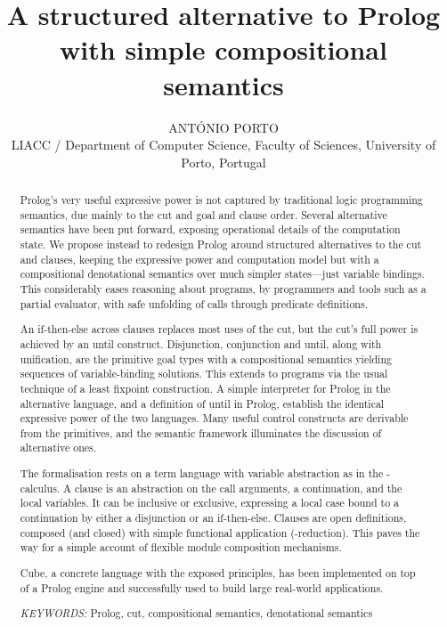 \documentclass{tlp}
\title{A structured alternative to Prolog with simple compositional semantics}
\author[António Porto]{ANTÓNIO PORTO\\
LIACC / Department of Computer Science, Faculty of Sciences, University of Porto, Portugal\\
\email{ap@dcc.fc.up.pt}}
\newcommand{\cube}{\textsf{Cube}}
\begin{document}
\maketitle

\begin{abstract}
  
  Prolog's very useful expressive power is not captured by traditional logic
  programming semantics, due mainly to the cut and  goal and
  clause order. Several alternative semantics have been put forward,
  exposing operational details of the computation state. We propose
  instead to redesign Prolog around structured alternatives to the cut and
  clauses, keeping the expressive power and computation model but with a
  compositional denotational semantics over much simpler states---just variable
  bindings. This considerably eases reasoning about programs, by programmers
  and tools such as a partial evaluator, with safe unfolding of calls through
  predicate definitions.

  An \textsf{if-then-else}{} across clauses replaces most uses of the cut, but
  the cut's full power is achieved by an \textsf{until} construct. Disjunction,
  conjunction and \textsf{until}, along with unification, are the primitive
  goal types with a compositional semantics yielding
  sequences of variable-binding solutions. This extends to programs
  via the usual technique of a least fixpoint construction. A simple interpreter
  for Prolog in the alternative language, and a definition of
  \textsf{until} in Prolog, establish the identical expressive power of the two
  languages. Many useful control constructs are derivable from the
  primitives, and the semantic framework illuminates the discussion of
  alternative ones.

  The formalisation rests on a term language with
  variable abstraction as in the -calculus. A clause is an abstraction
  on the call arguments, a continuation, and the local
  variables. It can be inclusive or exclusive, expressing a
  local case bound to a continuation by either a disjunction or an
  \textsf{if-then-else}. Clauses are open definitions, composed (and closed)
  with simple functional application (-reduction). This paves the way for
  a simple account of flexible module composition mechanisms.

  \cube, a concrete language with the exposed principles, has been implemented on
  top of a Prolog engine and successfully used to build large real-world
  applications.

\vspace{5pt}

\noindent\emph{KEYWORDS:} Prolog, cut, compositional semantics, denotational semantics

\end{abstract}
\end{document}
